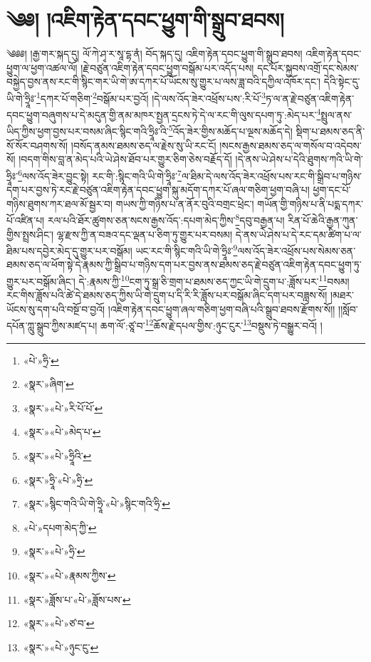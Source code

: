 \chapter{༄༅། །འཇིག་རྟེན་དབང་ཕྱུག་གི་སྒྲུབ་ཐབས།}༄༅༅། །རྒྱ་གར་སྐད་དུ། ལོ་ཀེ་ཤྭ་ར་སཱ་དྷ་ནཾ། བོད་སྐད་དུ། འཇིག་རྟེན་དབང་ཕྱུག་གི་སྒྲུབ་ཐབས། འཇིག་རྟེན་དབང་ཕྱུག་ལ་ཕྱག་འཚལ་ལོ། །རྗེ་བཙུན་འཇིག་རྟེན་དབང་ཕྱུག་བསྒོམ་པར་འདོད་པས། དང་པོར་སྐྱབས་འགྲོ་དང་སེམས་བསྐྱེད་བྱས་ནས་རང་གི་སྙིང་གར་ཡི་གེ་ཨ་དཀར་པོ་ཡོངས་སུ་གྱུར་པ་ལས་ཟླ་བའི་དཀྱིལ་འཁོར་དང་། དེའི་སྟེང་དུ་ཡི་གེ་ཧྲཱིཿ་\footnote{«པེ་»ཧྲི་}དཀར་པོ་གཅིག་\footnote{«སྣར་»ཞིག་}བསྒོམ་པར་བྱའོ། །དེ་ལས་འོད་ཟེར་འཕྲོས་པས་:རི་པོ་\footnote{«སྣར་»«པེ་»རི་པོ་པོ་}ཏ་ལ་ན་རྗེ་བཙུན་འཇིག་རྟེན་དབང་ཕྱུག་བཞུགས་པ་དེ་མདུན་གྱི་ནམ་མཁར་སྤྱན་དྲངས་ཏེ་དེ་ལ་རང་གི་ལུས་དཔག་ཏུ་:མེད་པར་\footnote{«སྣར་»«པེ་»མེད་པ་}སྤྲུལ་ནས་ཡིད་ཀྱིས་ཕྱག་བྱས་པར་བསམ་ཞིང་སྙིང་གའི་ཧྲཱིཿ་འི་\footnote{«སྣར་»«པེ་»ཧྲཱིའི་}འོད་ཟེར་གྱིས་མཆོད་པ་ལྔས་མཆོད་དེ། སྡིག་པ་ཐམས་ཅད་ནི་སོ་སོར་བཤགས་སོ། །བསོད་ནམས་ཐམས་ཅད་ལ་རྗེས་སུ་ཡི་རང་ངོ། །སངས་རྒྱས་ཐམས་ཅད་ལ་གསོལ་བ་འདེབས་སོ། །བདག་གིས་བླ་ན་མེད་པའི་ཡེ་ཤེས་ཐོབ་པར་གྱུར་ཅིག་ཅེས་བརྗོད་དོ། །དེ་ནས་ཡེ་ཤེས་པ་དེའི་ཐུགས་ཀའི་ཡི་གེ་ཧྲཱིཿ་\footnote{«སྣར་»ཧྲཱི་«པེ་»ཧྲི་}ལས་འོད་ཟེར་བྱུང་སྟེ། རང་གི་:སྙིང་གའི་ཡི་གེ་ཧྲཱིཿ་\footnote{«སྣར་»སྙིང་གའི་ཡི་གེ་ཧྲཱི་«པེ་»སྙིང་གའི་ཧྲི་}ལ་ཐིམ་དེ་ལས་འོད་ཟེར་འཕྲོས་པས་རང་གི་སྒྲིབ་པ་གཉིས་དག་པར་བྱས་ཏེ་རང་རྗེ་བཙུན་འཇིག་རྟེན་དབང་ཕྱུག་སྐུ་མདོག་དཀར་པོ་ཞལ་གཅིག་ཕྱག་བཞི་པ། ཕྱག་དང་པོ་གཉིས་ཐུགས་ཀར་ཐལ་མོ་སྦྱར་བ། གཡས་ཀྱི་གཉིས་པ་ན་ནོར་བུའི་བགྲང་ཕྲེང་། གཡོན་གྱི་གཉིས་པ་ནི་པདྨ་དཀར་པོ་འཛིན་པ། རལ་པའི་ཐོར་ཚུགས་ཅན་སངས་རྒྱས་འོད་:དཔག་མེད་ཀྱིས་\footnote{«པེ་»དཔག་མེད་ཀྱི་}དབུ་བརྒྱན་པ། རིན་པོ་ཆེའི་རྒྱན་ཀུན་གྱིས་སྤྲས་ཤིང་། ལྷ་རྫས་ཀྱི་ན་བཟའ་དང་ལྡན་པ་ཅིག་ཏུ་གྱུར་པར་བསམ། དེ་ནས་ཡེ་ཤེས་པ་དེ་རང་དམ་ཚིག་པ་ལ་ཐིམ་པས་དབྱེར་མེད་དུ་གྱུར་པར་བསྒོམ། ཡང་རང་གི་སྙིང་གའི་ཡི་གེ་ཧྲཱིཿ་\footnote{«སྣར་»«པེ་»ཧྲི་}ལས་འོད་ཟེར་འཕྲོས་པས་སེམས་ཅན་ཐམས་ཅད་ལ་ཕོག་སྟེ་དེ་རྣམས་ཀྱི་སྒྲིབ་པ་གཉིས་དག་པར་བྱས་ནས་ཐམས་ཅད་རྗེ་བཙུན་འཇིག་རྟེན་དབང་ཕྱུག་ཏུ་གྱུར་པར་བསྒོམ་ཞིང་། དེ་:རྣམས་ཀྱི་\footnote{«སྣར་»«པེ་»རྣམས་ཀྱིས་}ངག་ཏུ་སྒྲ་ཅི་གྲག་པ་ཐམས་ཅད་ཀྱང་ཡི་གེ་དྲུག་པ་:ཟློས་པར་\footnote{«སྣར་»ཟློས་པ་«པེ་»ཟློས་པས་}བསམ། རང་གིས་ཟློས་པའི་ཚེ་དེ་ཐམས་ཅད་ཀྱིས་ཡི་གེ་དྲུག་པ་དི་རི་རི་ཟློས་པར་བསྒོམ་ཞིང་དག་པར་བཟླས་སོ། །མཐར་ཡོངས་སུ་དག་པའི་བསྔོ་བ་བྱའོ། །འཇིག་རྟེན་དབང་ཕྱུག་ཞལ་གཅིག་ཕྱག་བཞི་པའི་སྒྲུབ་ཐབས་རྫོགས་སོ།། །།སློབ་དཔོན་ཀླུ་སྒྲུབ་ཀྱིས་མཛད་པ། ཆག་ལོ་:ཙཱ་བ་\footnote{«སྣར་»«པེ་»ཙ་བ་}ཆོས་རྗེ་དཔལ་གྱིས་:ཉུང་ངུར་\footnote{«སྣར་»«པེ་»ཉུང་ངུ་}བསྡུས་ཏེ་བསྒྱུར་བའོ། ། 